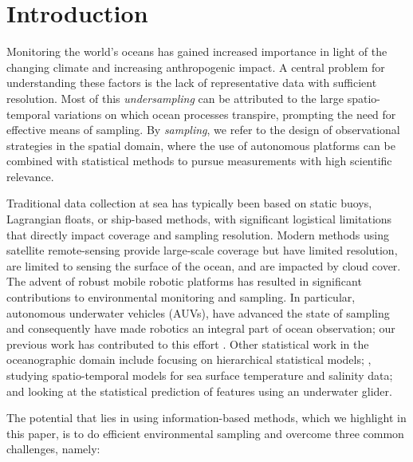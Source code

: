 \documentclass[aoas]{imsart}
\begin{document}
\section{Introduction}

Monitoring the world's oceans has gained increased importance in 
light of the changing climate and increasing anthropogenic impact. A
central problem for understanding these factors is the lack of
representative data with sufficient resolution. Most of this
\emph{undersampling} can be attributed to the large spatio-temporal
variations on which ocean processes transpire, prompting the need for
effective means of sampling. By \emph{sampling}, we refer to the design
of observational strategies in the spatial domain, where the use of
autonomous platforms can be combined with statistical methods to pursue
measurements with high scientific relevance.

Traditional data collection at sea has typically been based on static
buoys, Lagrangian floats, or ship-based methods, with significant
logistical limitations that directly impact coverage and sampling
resolution. Modern methods using satellite remote-sensing provide
large-scale coverage but have limited resolution, are limited to
sensing the surface of the ocean, and are impacted by cloud cover. The
advent of robust mobile robotic platforms \citep{Bellingham07} has
resulted in significant contributions to environmental monitoring and
sampling. In particular, autonomous underwater vehicles (AUVs), have
advanced the state of sampling and consequently have made robotics an
integral part of ocean observation; our previous work has contributed
to this effort \citep{das11b,Das2015,fossum18b,fossuminformation}. Other statistical
work in the oceanographic domain include \cite{wikle2013modern}
focusing on hierarchical statistical models; \cite{sahu2008space},
studying spatio-temporal models for sea surface temperature and
salinity data; and \cite{mellucci2018oceanic} looking at the
statistical prediction of features using an underwater glider.

The potential that lies in using information-based methods, which we
highlight in this paper, is to do efficient environmental sampling and
overcome three common challenges, namely:
\end{document}
